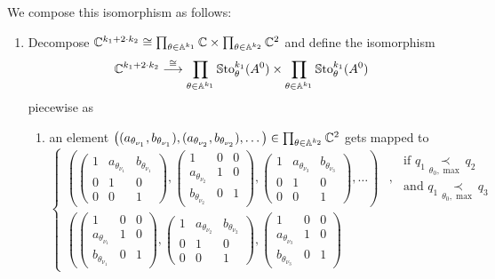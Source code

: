 We compose this isomorphism as follows:
\begin{enumerate}
  \item Decompose $\mathbb{C}^{k_1+2\cdot k_2}\cong
    \prod_{\theta\in\mathbb{A}^{k_1}} \mathbb{C} \times \prod_{\theta\in\mathbb{A}^{k_2}} \mathbb{C}^2$ and
    define the isomorphism
    \[
      \mathbb{C}^{k_1+2\cdot k_2}\overset{\cong}\longrightarrow
      \prod_{\theta\in\mathbb{A}^{k_1}} \operatorname{\mathbb{S}to}_{\theta}^{k_1}(A^0) \times
      \prod_{\theta\in\mathbb{A}^{k_1}} \operatorname{\mathbb{S}to}_{\theta}^{k_1}(A^0)
    \]
    piecewise as
    \begin{enumerate}
      \item an element
        $\left( (a_{\theta_{\nu_1}},b_{\theta_{\nu_1}})
          ,(a_{\theta_{\nu_2}},b_{\theta_{\nu_2}})
          ,\dots
        \right)\in\prod_{\theta\in\mathbb{A}^{k_2}} \mathbb{C}^2$
        gets mapped to
        \[
          \left.
          \begin{cases}
            \left(
            \begin{pmatrix} 1 & a_{\theta_{\nu_1}} & b_{\theta_{\nu_1}} \\0 & 1 & 0 \\0 & 0 & 1 \end{pmatrix}
            ,\begin{pmatrix} 1 & 0 & 0 \\a_{\theta_{\nu_2}} & 1 & 0 \\b_{\theta_{\nu_2}} & 0 & 1 \end{pmatrix}
            ,\begin{pmatrix} 1 & a_{\theta_{\nu_3}} & b_{\theta_{\nu_3}} \\0 & 1 & 0 \\0 & 0 & 1 \end{pmatrix}
              ,\dots
            \right)
            & ,\substack{\text{~if~} q_1 \underset{\theta_0,\max}{\prec} q_2
              \\\text{~and~} q_1 \underset{\theta_0,\max}{\prec} q_3}
            \\\left(
            \begin{pmatrix} 1 & 0 & 0 \\a_{\theta_{\nu_1}} & 1 & 0 \\b_{\theta_{\nu_1}} & 0 & 1 \end{pmatrix}
            ,\begin{pmatrix} 1 & a_{\theta_{\nu_2}} & b_{\theta_{\nu_2}} \\0 & 1 & 0 \\0 & 0 & 1 \end{pmatrix}
            ,\begin{pmatrix} 1 & 0 & 0 \\a_{\theta_{\nu_3}} & 1 & 0 \\b_{\theta_{\nu_3}} & 0 & 1 \end{pmatrix}

\end{cases}\]
\end{enumerate}
\end{enumerate}
